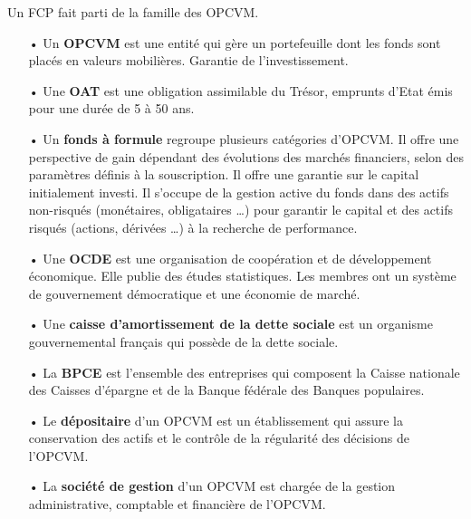\documentclass[french,12pt,a4paper]{article}
\begin{document}
Un FCP fait parti de la famille des OPCVM.\\
\begin{itemize}


\item[•]
Un \textbf{OPCVM} est une entité qui gère un portefeuille dont les fonds sont placés en valeurs mobilières. Garantie de l’investissement.\\

\item[•]
Une \textbf{OAT} est une obligation assimilable du Trésor, emprunts d’Etat émis pour une durée de 5 à 50 ans.\\

\item[•]
Un \textbf{fonds à formule} regroupe plusieurs catégories d’OPCVM. Il offre une perspective de gain dépendant des évolutions des marchés financiers, selon des paramètres définis à la souscription. Il offre une garantie sur le capital initialement investi. Il s'occupe de la gestion active du fonds dans des actifs non-risqués (monétaires, obligataires …) pour garantir le capital et des actifs risqués (actions, dérivées …) à la recherche de performance.\\

\item[•]
Une \textbf{OCDE} est une organisation de coopération et de développement économique. Elle publie des études statistiques. Les membres ont un système de gouvernement démocratique et une économie de marché.\\

\item[•]
Une \textbf{caisse d’amortissement de la dette sociale} est un organisme gouvernemental français qui possède de la dette sociale.\\

\item[•]
La \textbf{BPCE} est l'ensemble des entreprises qui composent la Caisse nationale des Caisses d’épargne et de la Banque fédérale des Banques populaires.\\

\item[•]
Le \textbf{dépositaire} d'un OPCVM est un établissement qui assure la conservation des actifs et le contrôle de la régularité des décisions de l'OPCVM.\\

\item[•]
La \textbf{société de gestion} d'un OPCVM est chargée de la gestion administrative, comptable et financière de l'OPCVM.\\


\end{itemize}
\end{document}
